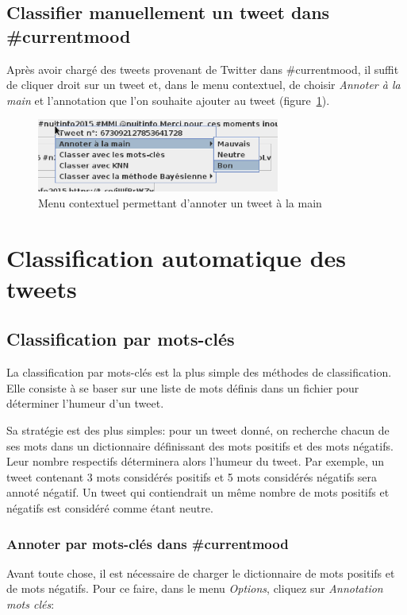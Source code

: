 \documentclass[12pt,a4paper]{report}
\newcommand{\CMName}{\#currentmood}
\begin{document}
\section{Classifier manuellement un tweet dans \CMName}
Après avoir chargé des tweets provenant de Twitter dans \CMName, il suffit de
cliquer droit sur un tweet et, dans le menu contextuel, de choisir
\textit{Annoter à la main} et l'annotation que l'on souhaite ajouter au tweet
(figure~\ref{capture-annoter-a-la-main}).

\begin{figure}[h]
	\centering
	\includegraphics[width=8cm]{img/capture-annoter-a-la-main.eps}
	\caption{Menu contextuel permettant d'annoter un tweet à la main}
	\label{capture-annoter-a-la-main}
\end{figure}

\chapter{Classification automatique des tweets}
\label{chapter-classifications}

\section{Classification par mots-clés}
La classification par mots-clés est la plus simple des méthodes de
classification. Elle consiste à se baser sur une liste de mots définis dans un
fichier pour déterminer l'humeur d'un tweet.

Sa stratégie est des plus simples: pour un tweet donné, on recherche
chacun de ses mots dans un dictionnaire définissant des mots positifs et des
mots négatifs. Leur nombre respectifs déterminera alors l'humeur du tweet. Par
exemple, un tweet contenant 3 mots considérés positifs et 5 mots considérés
négatifs sera annoté négatif. Un tweet qui contiendrait un même nombre de mots
positifs et négatifs est considéré comme étant neutre.

\subsection{Annoter par mots-clés dans \CMName}
Avant toute chose, il est nécessaire de charger le dictionnaire de mots positifs
et de mots négatifs. Pour ce faire, dans le menu \textit{Options}, cliquez sur
\textit{Annotation mots clés}:
\end{document}

